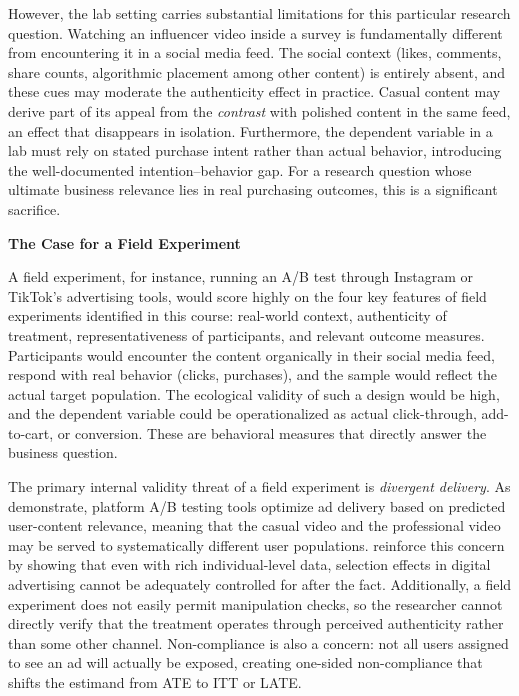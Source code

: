 \documentclass[10pt]{article}
\begin{document}
However, the lab setting carries substantial limitations for this particular research question. Watching an influencer video inside a survey is fundamentally different from encountering it in a social media feed. The social context (likes, comments, share counts, algorithmic placement among other content) is entirely absent, and these cues may moderate the authenticity effect in practice. Casual content may derive part of its appeal from the \textit{contrast} with polished content in the same feed, an effect that disappears in isolation. Furthermore, the dependent variable in a lab must rely on stated purchase intent rather than actual behavior, introducing the well-documented intention--behavior gap. For a research question whose ultimate business relevance lies in real purchasing outcomes, this is a significant sacrifice.

\textbf{The Case for a Field Experiment}

A field experiment, for instance, running an A/B test through Instagram or TikTok's advertising tools, would score highly on the four key features of field experiments identified in this course: real-world context, authenticity of treatment, representativeness of participants, and relevant outcome measures. Participants would encounter the content organically in their social media feed, respond with real behavior (clicks, purchases), and the sample would reflect the actual target population. The ecological validity of such a design would be high, and the dependent variable could be operationalized as actual click-through, add-to-cart, or conversion. These are behavioral measures that directly answer the business question.

The primary internal validity threat of a field experiment is \textit{divergent delivery}. As \textcite{braun2025abtesting} demonstrate, platform A/B testing tools optimize ad delivery based on predicted user-content relevance, meaning that the casual video and the professional video may be served to systematically different user populations. \textcite{gordon2019comparison} reinforce this concern by showing that even with rich individual-level data, selection effects in digital advertising cannot be adequately controlled for after the fact. Additionally, a field experiment does not easily permit manipulation checks, so the researcher cannot directly verify that the treatment operates through perceived authenticity rather than some other channel. Non-compliance is also a concern: not all users assigned to see an ad will actually be exposed, creating one-sided non-compliance that shifts the estimand from ATE to ITT or LATE.
\end{document}
